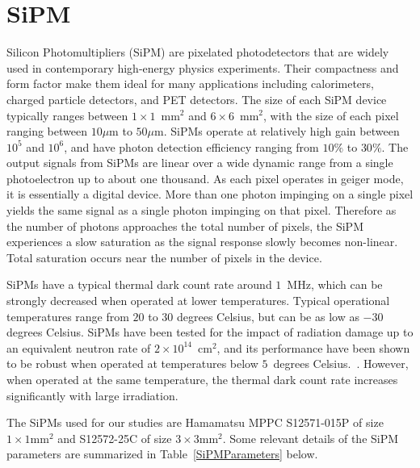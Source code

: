 \section{SiPM}
\label{sec:sipm}

Silicon Photomultipliers (SiPM) are pixelated photodetectors that are widely
used in contemporary high-energy physics experiments. Their compactness and form
factor make them ideal for many applications including calorimeters, charged
particle detectors, and PET detectors. The size of each SiPM device typically
ranges between $1\times 1$~$\mathrm{mm}^{2}$ and $6\times 6$~$\mathrm{mm}^{2}$,
with the size of each pixel ranging between $10\mu$m to $50\mu$m. SiPMs operate
at relatively high gain between $10^{5}$ and $10^{6}$, and have photon detection
efficiency ranging from $10\%$ to $30\%$. The output signals from SiPMs are
linear over a wide dynamic range from a single photoelectron up to about one
thousand. As each pixel operates in geiger mode, it is essentially a digital
device. More than one photon impinging on a single pixel yields the same signal
as a single photon impinging on that pixel. Therefore as the number of photons
approaches the total number of pixels, the SiPM experiences a slow saturation as
the signal response slowly becomes non-linear. Total saturation occurs near the
number of pixels in the device. 

SiPMs have a typical thermal dark count rate around $1$~MHz, which can be
strongly decreased when operated at lower temperatures. Typical operational
temperatures range from $20$ to $30$ degrees Celsius, but can be as low as $-30$
degrees Celsius. SiPMs have been tested for the impact of radiation damage up to
an equivalent neutron rate of $2\times10^{14}$~$\mathrm{cm}^{2}$, and its
performance have been shown to be robust when operated at temperatures below 
$5$~degrees Celsius.~\cite{SiPMIrradiated1,SiPMIrradiated2}. 
However, when operated at the same temperature, the thermal dark count rate increases
significantly with large irradiation.

The SiPMs used for our studies are Hamamatsu MPPC S12571-015P of 
size $1\times1\mathrm{mm}^{2}$ and S12572-25C of size 
$3\times3\mathrm{mm}^{2}$. Some relevant details of the SiPM parameters
are summarized in Table~\ref{SiPMParameters} below.

